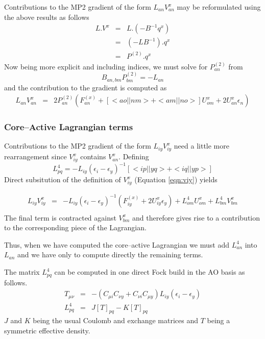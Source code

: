 \documentclass[fleqn,12pt]{article}
\newcommand{\bra}{<\!}
\newcommand{\ket}{\!>}
\newcommand{\Ptwo}{P^{(2)}}
\newcommand{\Fx}{F^{(x)}}
\begin{document}
Contributions to the MP2 gradient of the form $L_{an}V^x_{an}$ may be
reformulated using the above results as follows
\begin{eqnarray}
  L . V^x & = & L.\left( -B^{-1}q^x \right) \\
  & = & \left( -L B^{-1} \right). q^x \\
  & = & \Ptwo . q^x
\end{eqnarray}
Now being more explicit and including indices, we must solve for
$\Ptwo_{an}$ from
\begin{equation}
\label{eqn:ptwoan} 
  B_{an,bm} \Ptwo_{bm} = -L_{an}
\end{equation}
and the contribution to the gradient is computed as
\begin{eqnarray}
  L_{an}V^x_{an} & = &  2 \Ptwo_{an} \left(
    \Fx_{an} + \left[ \bra ao||nm \ket
      + \bra am||no \ket \right] U^x_{om} + 2 U^x_{an} \epsilon_n
  \right) 
\end{eqnarray}

\subsubsection{Core--Active Lagrangian terms}
\label{sec:calag}

Contributions to the MP2 gradient of the form $L_{iy}V^x_{iy}$ 
need a little more rearrangement since $V^x_{iy}$ contains 
$V^x_{an}$.  
Defining
\begin{equation}
\label{eqn:l4}
  L^4_{pq} = - L_{iy} \left( \epsilon_i -  \epsilon_y
  \right)^{-1} \left[ \bra ip||yq \ket + \bra iq||yp \ket \right]
\end{equation}
Direct subsitution of the definition of $V^x_{iy}$ (Equation 
\ref{eqn:viy}) yields

\begin{eqnarray}
\label{eqn:xxx}
  L_{iy} V^x_{iy} & = & - L_{iy} \left( \epsilon_i -  \epsilon_y  \right)^{-1} 
     \left(\Fx_{iy} + 2 U^x_{iy}  \epsilon_y \right)
    + L^4_{om} U^x_{om} + L^4_{bm}V^x_{bm}\\
\end{eqnarray}
The final term is contracted against $V^x_{bm}$ and therefore gives
rise to a contribution to the corresponding piece of the Lagrangian.

Thus, when we have computed the core--active Lagrangian we must add
$L^4_{an}$ into $L_{an}$ and we have only to compute directly the
remaining terms.

The matrix $L^4_{pq}$ can be computed in one direct Fock build in
the AO basis as follows.
\begin{eqnarray}
  T_{\mu \nu} & = & - \left(C_{\mu i} C_{\nu y} + C_{\nu i} C_{\mu y}
  \right) L_{iy} \left( \epsilon_i - \epsilon_y \right) \\ L^4_{pq} &
  = & J[T]_{pq} - K[T]_{pq}
\end{eqnarray}
$J$ and $K$ being the usual Coulomb and exchange matrices and $T$
being a symmetric effective density.
\end{document}
